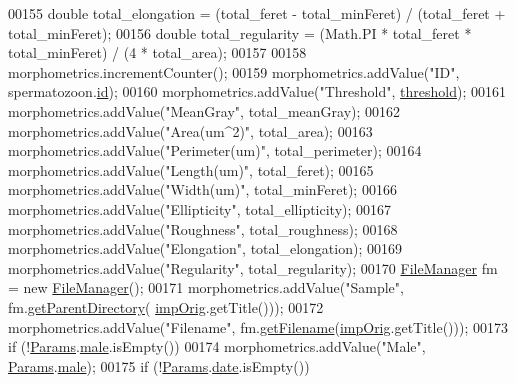 \begin{DoxyCode}
00155     \textcolor{keywordtype}{double} total\_elongation = (total\_feret - total\_minFeret) / (total\_feret + total\_minFeret);
00156     \textcolor{keywordtype}{double} total\_regularity = (Math.PI * total\_feret * total\_minFeret) / (4 * total\_area);
00157 
00158     morphometrics.incrementCounter();
00159     morphometrics.addValue(\textcolor{stringliteral}{"ID"}, spermatozoon.\hyperlink{classdata_1_1_spermatozoon_a76010eef1edc0406cc2375c25d2a433d}{id});
00160     morphometrics.addValue(\textcolor{stringliteral}{"Threshold"}, \hyperlink{classgui_1_1_image_analysis_window_afcfbedec6ebde62c6a091ce335836ef1}{threshold});
00161     morphometrics.addValue(\textcolor{stringliteral}{"MeanGray"}, total\_meanGray);
00162     morphometrics.addValue(\textcolor{stringliteral}{"Area(um^2)"}, total\_area);
00163     morphometrics.addValue(\textcolor{stringliteral}{"Perimeter(um)"}, total\_perimeter);
00164     morphometrics.addValue(\textcolor{stringliteral}{"Length(um)"}, total\_feret);
00165     morphometrics.addValue(\textcolor{stringliteral}{"Width(um)"}, total\_minFeret);
00166     morphometrics.addValue(\textcolor{stringliteral}{"Ellipticity"}, total\_ellipticity);
00167     morphometrics.addValue(\textcolor{stringliteral}{"Roughness"}, total\_roughness);
00168     morphometrics.addValue(\textcolor{stringliteral}{"Elongation"}, total\_elongation);
00169     morphometrics.addValue(\textcolor{stringliteral}{"Regularity"}, total\_regularity);
00170     \hyperlink{classfunctions_1_1_file_manager}{FileManager} fm = \textcolor{keyword}{new} \hyperlink{classfunctions_1_1_file_manager}{FileManager}();
00171     morphometrics.addValue(\textcolor{stringliteral}{"Sample"}, fm.\hyperlink{classfunctions_1_1_file_manager_aa9e15d838c5a7a0e3906d9ceec253398}{getParentDirectory}(
      \hyperlink{classgui_1_1_image_analysis_window_a69562d3583c362d2b643c170f0eae39f}{impOrig}.getTitle()));
00172     morphometrics.addValue(\textcolor{stringliteral}{"Filename"}, fm.\hyperlink{classfunctions_1_1_file_manager_ad027758f34214960a7aa800e0f7c19db}{getFilename}(\hyperlink{classgui_1_1_image_analysis_window_a69562d3583c362d2b643c170f0eae39f}{impOrig}.getTitle()));
00173     \textcolor{keywordflow}{if} (!\hyperlink{classdata_1_1_params}{Params}.\hyperlink{classdata_1_1_params_a3e07114fb70a676dfe24fad6be8c3c75}{male}.isEmpty())
00174       morphometrics.addValue(\textcolor{stringliteral}{"Male"}, \hyperlink{classdata_1_1_params}{Params}.\hyperlink{classdata_1_1_params_a3e07114fb70a676dfe24fad6be8c3c75}{male});
00175     \textcolor{keywordflow}{if} (!\hyperlink{classdata_1_1_params}{Params}.\hyperlink{classdata_1_1_params_aecbab8174a6d72649883508cf9940d58}{date}.isEmpty())

\end{DoxyCode}
